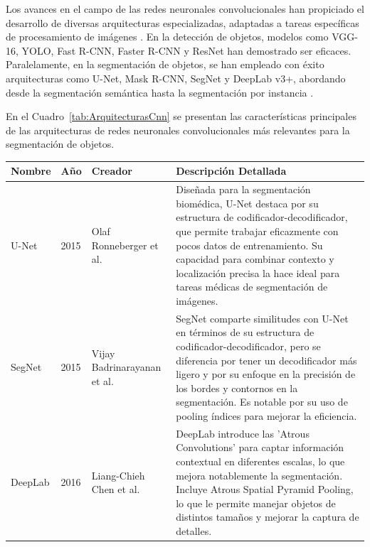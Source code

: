 Los avances en el campo de las redes neuronales convolucionales han propiciado el desarrollo de diversas arquitecturas especializadas, adaptadas a tareas específicas de procesamiento de imágenes \cite{alom2018history}. En la detección de objetos, modelos como VGG-16, YOLO, Fast R-CNN, Faster R-CNN y ResNet han demostrado ser eficaces. Paralelamente, en la segmentación de objetos, se han empleado con éxito arquitecturas como U-Net, Mask R-CNN, SegNet y DeepLab v3+, abordando desde la segmentación semántica hasta la segmentación por instancia \cite{hoeser2020object, hoeser2020object2}.

En el Cuadro~\ref{tab:ArquitecturasCnn} se presentan las características principales de las arquitecturas de redes neuronales convolucionales más relevantes para la segmentación de objetos.

\begin{table}[H]
    \centering
    \begin{tabular}{|l|l|l|p{6cm}|}
        \hline
        \textbf{Nombre} & \textbf{Año} & \textbf{Creador}            & \textbf{Descripción Detallada}                                                                                                                                                                                                                                                                                                              \\
        \hline
        U-Net           & 2015         & Olaf Ronneberger et al.     & Diseñada para la segmentación biomédica, U-Net destaca por su estructura de codificador-decodificador, que permite trabajar eficazmente con pocos datos de entrenamiento. Su capacidad para combinar contexto y localización precisa la hace ideal para tareas médicas de segmentación de imágenes.                                         \\
        \hline
        SegNet          & 2015         & Vijay Badrinarayanan et al. & SegNet comparte similitudes con U-Net en términos de su estructura de codificador-decodificador, pero se diferencia por tener un decodificador más ligero y por su enfoque en la precisión de los bordes y contornos en la segmentación. Es notable por su uso de pooling índices para mejorar la eficiencia.                               \\
        \hline
        DeepLab         & 2016         & Liang-Chieh Chen et al.     & DeepLab introduce las 'Atrous Convolutions' para captar información contextual en diferentes escalas, lo que mejora notablemente la segmentación. Incluye Atrous Spatial Pyramid Pooling, lo que le permite manejar objetos de distintos tamaños y mejorar la captura de detalles.                                                          \\

\end{tabular}
\end{table}
